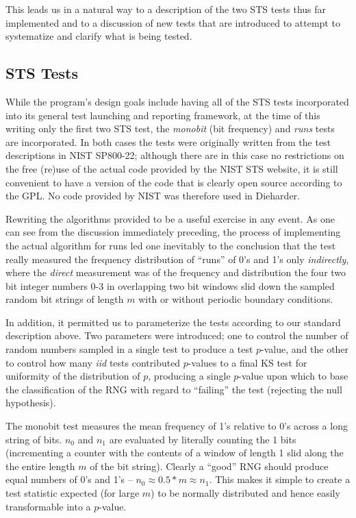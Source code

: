 \documentclass[12pt]{article}
\begin{document}
This leads us in a natural way to a description of the two STS tests
thus far implemented and to a discussion of new tests that are
introduced to attempt to systematize and clarify what is being tested.

\subsection{STS Tests}

While the program's design goals include having all of the STS tests
incorporated into its general test launching and reporting framework, at
the time of this writing only the first two STS test, the {\em monobit}
(bit frequency) and {\em runs} tests are incorporated.  In both cases
the tests were originally written from the test descriptions in NIST
SP800-22; although there are in this case no restrictions on the free
(re)use of the actual code provided by the NIST STS website, it is still
convenient to have a version of the code that is clearly open source
according to the GPL.  No code provided by NIST was therefore used in
Dieharder.

Rewriting the algorithms provided to be a useful exercise in any event.
As one can see from the discussion immediately preceding, the process of
implementing the actual algorithm for runs led one inevitably to the
conclusion that the test really measured the frequency distribution of
``runs'' of 0's and 1's only {\em indirectly}, where the {\em direct}
measurement was of the frequency and distribution the four two bit
integer numbers 0-3 in overlapping two bit windows slid down the sampled
random bit strings of length $m$ with or without periodic boundary
conditions.

In addition, it permitted us to parameterize the tests according to our
standard description above.  Two parameters were introduced; one to
control the number of random numbers sampled in a single test to produce
a test $p$-value, and the other to control how many {\em iid} tests
contributed $p$-values to a final KS test for uniformity of the
distribution of $p$, producing a single $p$-value upon which to base the
classification of the RNG with regard to ``failing'' the test (rejecting
the null hypothesis).

The monobit test measures the mean frequency of 1's relative to 0's
across a long string of bits.  $n_0$ and $n_1$ are evaluated by
literally counting the 1 bits (incrementing a counter with the contents
of a window of length 1 slid along the the entire length $m$ of the bit
string).  Clearly a ``good'' RNG should produce equal numbers of 0's and
1's -- $n_0 \approx 0.5*m \approx n_1$.  This makes it simple to create
a test statistic expected (for large $m$) to be normally distributed and
hence easily transformable into a $p$-value.
\end{document}
